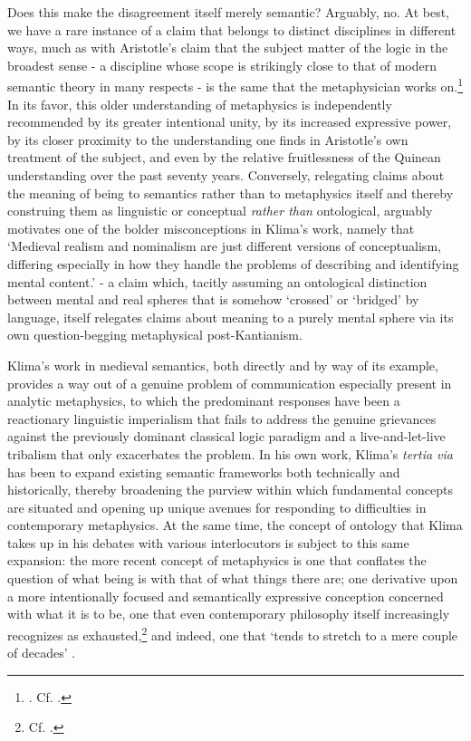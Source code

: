 \documentclass[]{article}
\begin{document}
Does this make the disagreement itself merely semantic? 
Arguably, no. 
At best, we have a rare instance of a claim that belongs to distinct disciplines in different ways, 
much as with Aristotle's claim that the subject matter of the logic in the broadest sense - 
a discipline whose scope is strikingly close to that of modern semantic theory in many respects - 
is the same that the metaphysician works on.\footnote{\autocite[1004b 22-23]{Metaph}. Cf. \autocite[q. 3]{ScotusIsagoge}.}
In its favor, 
this older understanding of metaphysics is independently recommended 
by its greater intentional unity, 
by its increased expressive power, 
by its closer proximity to the understanding one finds in Aristotle's own treatment of the subject, 
and even by the relative fruitlessness of the Quinean understanding over the past seventy years.
Conversely, 
relegating claims about the meaning of being to semantics 
rather than to metaphysics itself 
and thereby construing them as linguistic or conceptual \emph{rather than} ontological, 
arguably motivates one of the bolder misconceptions in Klima's work, 
namely that 
`Medieval realism and nominalism are just different versions of conceptualism, differing especially in how they handle the problems of
describing and identifying mental content.'\autocite[110]{Klima2011} 
- a claim which, 
tacitly assuming an ontological distinction between mental and real spheres that is somehow `crossed' or `bridged' by language, 
itself relegates claims about meaning to a purely mental sphere via its own question-begging metaphysical post-Kantianism.

Klima's work in medieval semantics, 
both directly and by way of its example, 
provides a way out of a genuine problem of communication especially present in analytic metaphysics,
to which the predominant responses have been 
a reactionary linguistic imperialism that fails to address the genuine grievances against the previously dominant classical logic paradigm 
and a live-and-let-live tribalism that only exacerbates the problem. 
In his own work, Klima's \emph{tertia via} has been to expand existing semantic frameworks both technically and historically, 
thereby 
broadening the purview within which fundamental concepts are situated 
and 
opening up unique avenues for responding to difficulties in contemporary metaphysics. 
At the same time, 
the concept of ontology that Klima takes up in his debates with various interlocutors is subject to this same expansion: 
the more recent concept of metaphysics is 
one that conflates the question of what being is with that of what things there are;
one derivative upon a more intentionally focused and semantically expressive conception concerned with what it is to be, 
one that even contemporary philosophy itself increasingly recognizes as exhausted,\footnote{Cf. \autocite{Schaffer2009}.}
and indeed, one that `tends to stretch to a mere couple of decades' \autocite[17]{Klima2005}.

\printbibliography
\end{document}
